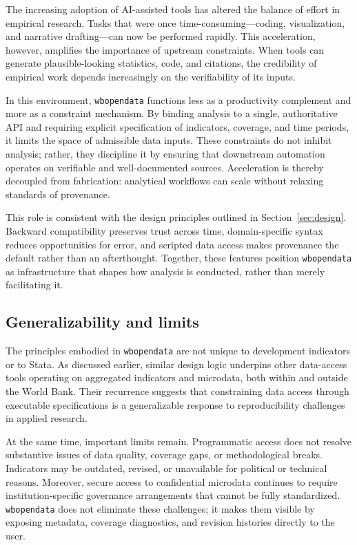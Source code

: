 \documentclass[bib]{statapress}
\begin{document}
The increasing adoption of AI-assisted tools has altered the balance of effort
in empirical research. Tasks that were once time-consuming—coding, visualization,
and narrative drafting—can now be performed rapidly. This acceleration,
however, amplifies the importance of upstream constraints. When tools can
generate plausible-looking statistics, code, and citations, the credibility of
empirical work depends increasingly on the verifiability of its inputs.

In this environment, \texttt{wbopendata} functions less as a productivity
complement and more as a constraint mechanism. By binding analysis to a single,
authoritative API and requiring explicit specification of indicators, coverage,
and time periods, it limits the space of admissible data inputs. These constraints
do not inhibit analysis; rather, they discipline it by ensuring that downstream
automation operates on verifiable and well-documented sources. Acceleration is
thereby decoupled from fabrication: analytical workflows can scale without
relaxing standards of provenance.

This role is consistent with the design principles outlined in Section~\ref{sec:design}.
Backward compatibility preserves trust across time, domain-specific syntax
reduces opportunities for error, and scripted data access makes provenance the
default rather than an afterthought. Together, these features position
\texttt{wbopendata} as infrastructure that shapes how analysis is conducted,
rather than merely facilitating it.

\subsection{Generalizability and limits}

The principles embodied in \texttt{wbopendata} are not unique to development
indicators or to Stata. As discussed earlier, similar design logic underpins
other data-access tools operating on aggregated indicators and microdata, both
within and outside the World Bank. Their recurrence suggests that constraining
data access through executable specifications is a generalizable response to
reproducibility challenges in applied research.

At the same time, important limits remain. Programmatic access does not resolve
substantive issues of data quality, coverage gaps, or methodological breaks.
Indicators may be outdated, revised, or unavailable for political or technical
reasons. Moreover, secure access to confidential microdata continues to require
institution-specific governance arrangements that cannot be fully standardized.
\texttt{wbopendata} does not eliminate these challenges; it makes them visible by
exposing metadata, coverage diagnostics, and revision histories directly to the
user.
\end{document}
